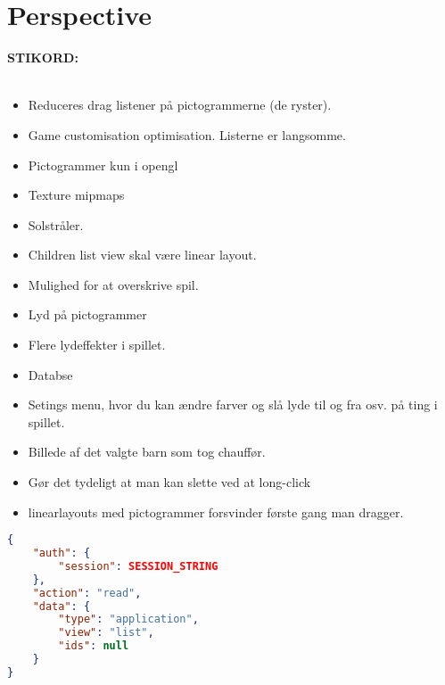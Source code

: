 \chapter{Perspective}
\textbf{STIKORD:}\\\\
\begin{itemize}
\item Reduceres drag listener på pictogrammerne (de ryster).
\item Game customisation optimisation. Listerne er langsomme.
\item Pictogrammer kun i opengl
\item Texture mipmaps
\item Solstråler.
\item Children list view skal være linear layout.
\item Mulighed for at overskrive spil.
\item Lyd på pictogrammer
\item Flere lydeffekter i spillet.
\item Databse 
\item Setings menu, hvor du kan ændre farver og slå lyde til og fra osv. på ting i spillet.
\item Billede af det valgte barn som tog chauffør.
\item Gør det tydeligt at man kan slette ved at long-click
\item linearlayouts med pictogrammer forsvinder første gang man dragger.
\end{itemize}
\begin{lstlisting}[language=json,firstnumber=1,caption={JSON guery to read application data},label=lst:jsonread]
{
	"auth": {
		"session": SESSION_STRING
	},
	"action": "read",
	"data": {
		"type": "application",
		"view": "list",
		"ids": null
	}
}
\end{lstlisting} 
